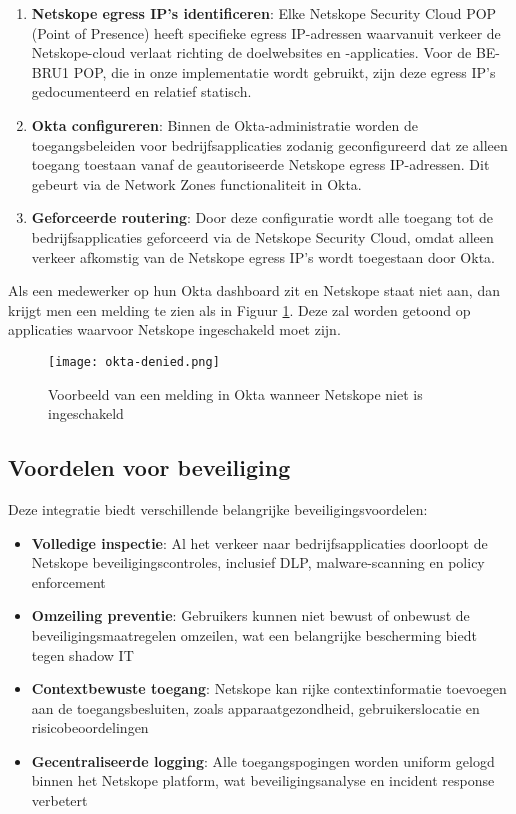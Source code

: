\begin{enumerate}
    \item \textbf{Netskope egress IP's identificeren}: Elke Netskope Security Cloud POP (Point of Presence) heeft specifieke egress IP-adressen waarvanuit verkeer de Netskope-cloud verlaat richting de doelwebsites en -applicaties. Voor de BE-BRU1 POP, die in onze implementatie wordt gebruikt, zijn deze egress IP's gedocumenteerd en relatief statisch.

    \item \textbf{Okta configureren}: Binnen de Okta-administratie worden de toegangsbeleiden voor bedrijfsapplicaties zodanig geconfigureerd dat ze alleen toegang toestaan vanaf de geautoriseerde Netskope egress IP-adressen. Dit gebeurt via de Network Zones functionaliteit in Okta.

    \item \textbf{Geforceerde routering}: Door deze configuratie wordt alle toegang tot de bedrijfsapplicaties geforceerd via de Netskope Security Cloud, omdat alleen verkeer afkomstig van de Netskope egress IP's wordt toegestaan door Okta.
\end{enumerate}

Als een medewerker op hun Okta dashboard zit en Netskope staat niet aan, dan krijgt men een melding te zien als in Figuur \ref{fig:okta-denied}. Deze zal worden getoond op applicaties waarvoor Netskope ingeschakeld moet zijn.
\begin{figure}[h!]
    \centering
    \texttt{[image: okta-denied.png]}
    \caption[Geen Netskope Okta melding]{Voorbeeld van een melding in Okta wanneer Netskope niet is ingeschakeld}
    \label{fig:okta-denied}
\end{figure}

\subsection{Voordelen voor beveiliging}

Deze integratie biedt verschillende belangrijke beveiligingsvoordelen:

\begin{itemize}
    \item \textbf{Volledige inspectie}: Al het verkeer naar bedrijfsapplicaties doorloopt de Netskope beveiligingscontroles, inclusief DLP, malware-scanning en policy enforcement
    \item \textbf{Omzeiling preventie}: Gebruikers kunnen niet bewust of onbewust de beveiligingsmaatregelen omzeilen, wat een belangrijke bescherming biedt tegen shadow IT
    \item \textbf{Contextbewuste toegang}: Netskope kan rijke contextinformatie toevoegen aan de toegangsbesluiten, zoals apparaatgezondheid, gebruikerslocatie en risicobeoordelingen
    \item \textbf{Gecentraliseerde logging}: Alle toegangspogingen worden uniform gelogd binnen het Netskope platform, wat beveiligingsanalyse en incident response verbetert
\end{itemize}

